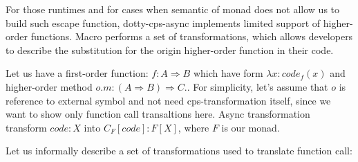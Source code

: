 \documentclass{llncs}
\begin{document}
  For those runtimes and for cases when semantic of monad does not allow us to build such escape function, dotty-cps-async implements limited support of higher-order functions.  Macro performs a set of transformations, which allows developers to describe the substitution for the origin higher-order function in their code.
 

Let us have a first-order function: $f: A \Rightarrow B$ which have form $\lambda x: code_{f}(x)$  and higher-order method $o.m: (A \Rightarrow B) \Rightarrow C$.. For simplicity, let's assume that $o$ is reference to external symbol and not need cps-transformation itself, since we want to show only function call transaltions here.  Async transformation transform $code:X$ into $C_F[code]: F[X]$, where $F$ is our monad. 

Let us informally describe a set of transformations used to translate function call:
\end{document}
